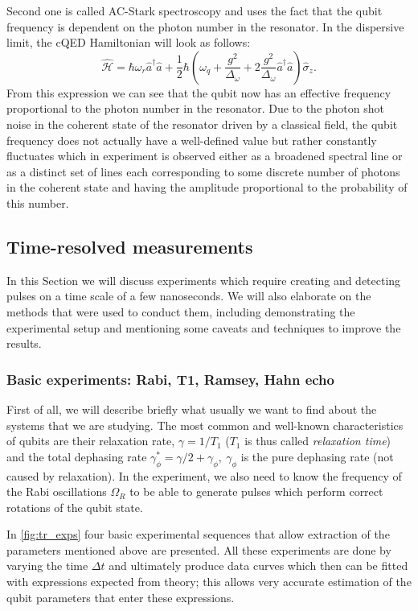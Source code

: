 Second one is called AC-Stark spectroscopy and uses the fact that the qubit frequency is dependent on the photon number in the resonator. In the dispersive limit, the cQED Hamiltonian will look as follows:
\[
\mathcal{\hat H} = \hbar\omega_r \hat a^\dag\hat a + \frac{1}{2}\hbar(\omega_q+\frac{g^2}{\Delta_\omega}+2\frac{g^2}{\Delta_\omega}\hat a^\dag\hat a)\hat\sigma_z.
\]
From this expression we can see that the qubit now has an effective frequency proportional to the photon number in the resonator. Due to the photon shot noise in the coherent state of the resonator driven by a classical field, the qubit frequency does not actually have a well-defined value but rather constantly fluctuates which in experiment is observed either as a broadened spectral line or as a distinct set of lines each corresponding to some discrete number of photons in the coherent state and having the amplitude proportional to the probability of this number\cite{schuster2007}.

\subsection{Time-resolved measurements}

In this Section we will discuss experiments which require creating and detecting pulses on a time scale of a few nanoseconds. We will also elaborate on the methods that were used to conduct them, including demonstrating the experimental setup and mentioning some caveats and techniques to improve the results.

\subsubsection{Basic experiments: Rabi, T1, Ramsey, Hahn echo}

First of all, we will describe briefly what usually we want to find about the systems that we are studying. The most common and well-known characteristics of qubits are their relaxation rate, $\gamma = 1/T_1$ ($T_1$ is thus called \textit{relaxation time}) and the total dephasing rate $\gamma_\phi^* = \gamma/2 +\gamma_\phi,\ \gamma_\phi$ is the pure dephasing rate (not caused by relaxation). In the experiment, we also need to know the frequency of the Rabi oscillations $\Omega_R$ to be able to generate pulses which perform correct rotations of the qubit state.

In \autoref{fig:tr_exps} four basic experimental sequences that allow extraction of the parameters mentioned above are presented. All these experiments are done by varying the time $\Delta t$ and ultimately produce data curves which then can be fitted with expressions expected from theory; this allows very accurate estimation of the qubit parameters that enter these expressions.

